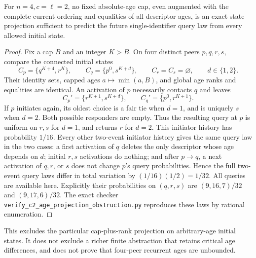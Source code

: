 \begin{proposition}
\label{prop:c2caprankobstruction}
For $n=4,c=\ell=2$, no fixed absolute-age cap, even augmented
with the complete current ordering and equalities of all
descriptor ages, is an exact state projection sufficient to
predict the future single-identifier query law from every
allowed initial state.
\end{proposition}
\begin{proof}
Fix a cap $B$ and an integer $K>B$. On four distinct peers
$p,q,r,s$, compare the connected initial states
\[
 C_p=\{q^{K+4},r^K\},\qquad
 C_q=\{p^0,s^{K+d}\},\qquad
 C_r=C_s=\varnothing,
 \qquad d\in\{1,2\}.
\]
Their identity sets, capped ages $a\mapsto\min(a,B)$, and
global age ranks and equalities are identical. An activation
of $p$ necessarily contacts $q$ and leaves
\[
 C_p'=\{r^{K+1},s^{K+d}\},\qquad
 C_q'=\{p^0,r^{K+1}\}.
\]
If $p$ initiates again, its oldest choice is a fair tie when
$d=1$, and is uniquely $s$ when $d=2$. Both possible
responders are empty. Thus the resulting query at $p$ is
uniform on $r,s$ for $d=1$, and returns $r$ for $d=2$.
This initiator history has probability $1/16$.
Every other two-event initiator history gives the same query
law in the two cases: a first activation of $q$ deletes the
only descriptor whose age depends on $d$; initial $r,s$
activations do nothing; and after $p\to q$, a next
activation of $q,r$, or $s$ does not change $p$'s query
probabilities. Hence the full two-event query laws differ
in total variation by $(1/16)(1/2)=1/32$.
All queries are available here. Explicitly their probabilities
on $(q,r,s)$ are $(9,16,7)/32$ and $(9,17,6)/32$.
The exact checker
\texttt{verify\_c2\_age\_projection\_obstruction.py}
reproduces these laws by rational enumeration.
\end{proof}

This excludes the particular cap-plus-rank projection on
arbitrary-age initial states. It does not exclude a richer
finite abstraction that retains critical age differences,
and does not prove that four-peer recurrent ages are unbounded.
